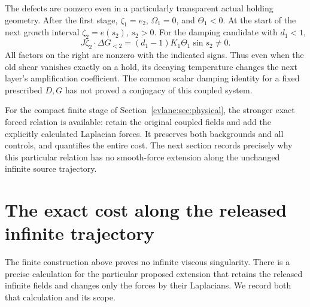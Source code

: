 The defects are nonzero even in a particularly transparent
actual holding geometry. After the first stage,
$\zeta_1=e_2$, $\Omega_1=0$, and $\Theta_1<0$. At the start
of the next growth interval $\zeta_2=e(s_2)$, $s_2>0$.
For the damping candidate with $d_1<1$,
\[
 J\zeta_2\cdot\Delta G_{<2}
 =(d_1-1)K_1\Theta_1\sin s_2\ne0.
\]
All factors on the right are nonzero with the indicated signs.
Thus even when the old shear vanishes exactly on a hold, its
decaying temperature changes the next layer's amplification
coefficient. The common scalar damping identity for a fixed
prescribed $D,G$ has not proved a conjugacy of this coupled system.

For the compact finite stage of Section~\ref{cvlane:sec:physical}, the
stronger exact forced relation is available: retain the original
coupled fields and add the explicitly calculated Laplacian forces.
It preserves both backgrounds and all controls, and quantifies the
entire cost. The next section records precisely why this particular
relation has no smooth-force extension along the unchanged infinite
source trajectory.


\section{The exact cost along the released infinite trajectory}
\label{cvlane:sec:infinitecost}
The finite construction above proves no infinite viscous singularity.
There is a precise calculation for the particular proposed extension
that retains the released infinite fields and changes only the forces
by their Laplacians. We record both that calculation and its scope.

